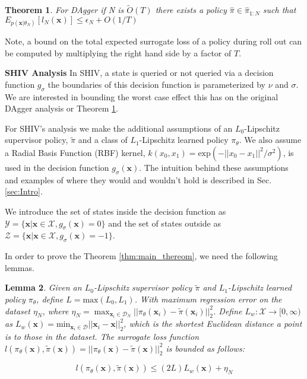 \documentclass[10pt, conference]{ieeeconf}      %
\newtheorem{theorem}{Theorem}[section]
\newtheorem{lemma}[theorem]{Lemma}
\newcommand{\bx}{\mathbf{x}}
\begin{document}
\begin{theorem}\label{thm:Dagger}
For DAgger if N is $\tilde{O}(T)$ there exists a policy $\hat{\pi} \in \hat{\pi}_{1:N}$ such that $E_{p(\bx|\theta_N)}[l_N(\bx)] \leq \epsilon_N + O(1/T)$\\
\end{theorem}

Note, a bound on the total expected surrogate loss of a policy during roll out  can be computed by multiplying the right hand side by a factor of $T$. 


\noindent \textbf{SHIV Analysis} In SHIV, a state is queried or not queried via a decision function $g_{\sigma}$ the boundaries of this decision function is parameterized by $\nu$ and $\sigma$. We are interested in bounding the worst case effect this has on the original DAgger analysis or Theorem \ref{thm:Dagger}. 

For SHIV's analysis we make the additional assumptions of an $L_0$-Lipschitz supervisor policy, $\tilde{\pi}$ and a class of $L_1$-Lipschitz learned policy $\pi_\theta$.  We also assume a Radial Basis Function (RBF) kernel, $k(x_0,x_1) = \mbox{exp}(-||x_0-x_1||^2/\sigma^2)$, is used in the decision function $g_\sigma(\bx)$. The intuition behind these assumptions and examples of where they would and wouldn't hold is described in Sec. \ref{sec:Intro}. 

We introduce the set of states inside the decision function as $\mathcal{Y} = \lbrace \bx | \bx \in \mathcal{X}, g_\sigma(\bx) = 0 \rbrace$ and the set of states outside as $\mathcal{Z} = \lbrace \bx | \bx \in \mathcal{X}, g_\sigma(\bx) = -1 \rbrace$.


 In order to prove the Theorem \ref{thm:main_thereom}, we need the following lemmas. \\

\begin{lemma} \label{lm:lipschitz}
Given an $L_0$-Lipschitz supervisor policy $\tilde{\pi}$ and $L_1$-Lipschitz learned policy $\pi_\theta$, define $L = \mbox{max}(L_0,L_1)$. With maximum regression error on the dataset $\eta_N$, where $\eta_N = \max_{\bx_i \in \mathcal{D}_N} ||\pi_\theta(\bx_i) - \tilde{\pi}(\bx_i)||^2_2$. Define $L_w: \mathcal{X} \rightarrow [0,\infty)$ as $L_w(\bx) =\mbox{min}_{\bx_i \in \mathcal{D}} ||\bx_i - \bx||_2^2$, which is the shortest Euclidean distance a point is to those in the dataset. The surrogate loss function $l(\pi_\theta(\bx),\tilde{\pi}(\bx)) = ||\pi_\theta(\bx) - \tilde{\pi}(\bx)||^2_2 $ is bounded as follows: 

$$l(\pi_\theta(\bx),\tilde{\pi}(\bx)) \leq (2L)L_w(\bx) + \eta_N$$\\
\end{lemma}
\end{document}
